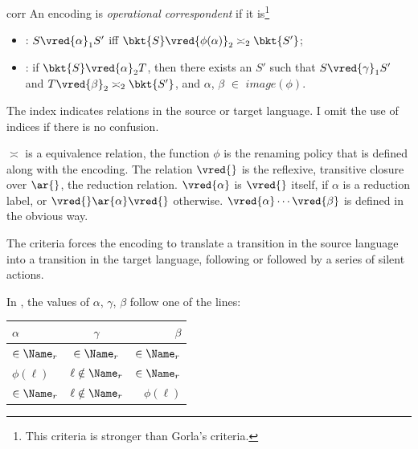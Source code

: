
\begin{criteria}{corr}\cite{EM99}\cite{DG10}
  An encoding is \emph{operational correspondent} if it is\footnote{This criteria is stronger than Gorla's criteria.}
	\begin{itemize}
		\item {}: $S\vred{\alpha}_1S'$ iff $\bkt{S}\vred{\phi(\alpha)}_2\asymp_2\bkt{S'}$;
		\item {}: if $\bkt{S}\vred{\alpha}_2T$, then there exists an $S'$ such that $S\vred{\gamma}_1S'$ and $T\vred{\beta}_2\asymp_2\bkt{S'}$, and $\alpha$, $\beta$ $\in$ $image(\phi)$.
  \end{itemize}
\end{criteria}

The index indicates relations in the source or target language.
I omit the use of indices if there is no confusion.

$\asymp$ is a equivalence relation, the function $\phi$ is the renaming policy that is defined along with the encoding.
The relation $\vred{}$ is the reflexive, transitive closure over $\ar{}$, the reduction relation. $\vred{\alpha}$ is $\vred{}$ itself, if $\alpha$ is a reduction label, or $\vred{} \ar{\alpha} \vred{}$ otherwise.
$\vred{\alpha}\cdots\vred{\beta}$ is defined in the obvious way.

The  criteria forces the encoding to translate a transition in the source language into a transition in the target language, following or followed by a series of silent actions.

In , the values of $\alpha$, $\gamma$, $\beta$ follow one of the lines:

\begin{table}[h!]
  \begin{center}
    \label{tab:table1}
    \begin{tabular}{l|c|r} %
      $\alpha$ & $\gamma$ & $\beta$ \\
      \hline
      $\in\Name_r$ & $\in\Name_r$ & $\in\Name_r$\\
      $\phi(\ell)$ & $\ell\notin\Name_r$ & $\in\Name_r$\\
      $\in\Name_r$ & $\ell\notin\Name_r$ & $\phi(\ell)$\\
    \end{tabular}
  \end{center}
\end{table}

